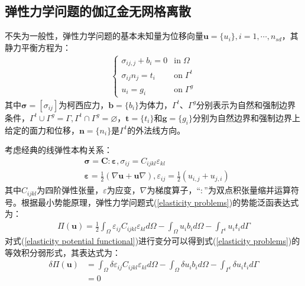 \subsection{弹性力学问题的伽辽金无网格离散}
不失为一般性，弹性力学问题的基本未知量为位移向量$\pmb{u}=\{u_i\},i=1,\dotsb,n_{sd}$，其静力平衡方程为：
\begin{equation}\label{elasticity problems}
\begin{split}
\begin{cases}
    \sigma_{ij,j}+b_i=0&\text{in}\;\Omega\\
    \sigma_{ij}n_j=t_i&\text{on}\;\Gamma^t\\
    u_i=g_i&\text{on}\;\Gamma^g
\end{cases}
\end{split}
\end{equation}
其中$\pmb \sigma=[\sigma_{ij}]$为柯西应力，$\pmb{b}=\{b_i\}$为体力，$\Gamma^t \text{、}\Gamma^g$分别表示为自然和强制边界条件，$\Gamma^t\cup \Gamma^g=\Gamma,\Gamma^t\cap \Gamma^g=\varnothing$，$\pmb{t}=\{t_i\}$和$\pmb{g}=\{g_i\}$分别为自然边界和强制边界上给定的面力和位移，$\pmb{n}=\{n_i\}$是$\Gamma^{t}$的外法线方向。\par
考虑经典的线弹性本构关系：
\begin{equation}\label{constitutive relation}
\begin{split}
        &\pmb{\sigma}=\pmb{C}\pmb{:}\pmb{\varepsilon},\sigma_{ij}=C_{ijkl}\varepsilon_{kl}\\
        &\pmb{\varepsilon}=\frac{1}{2}(\nabla \pmb{u}+\pmb{u}\nabla),\varepsilon_{ij}=\frac{1}{2}(u_{i,j}+u_{j,i})
\end{split}
\end{equation}
其中$C_{ijkl}$为四阶弹性张量，$\varepsilon$为应变，$\nabla$为梯度算子，“$\pmb{:}$”为双点积张量缩并运算符号。根据最小势能原理，弹性力学问题式(\ref{elasticity problems})的势能泛函表达式为：
\begin{equation}\label{elasticity potential functional}
\begin{split}
    \Pi(\pmb{u})=\frac{1}{2}\int_{\Omega}\varepsilon_{ij}C_{ijkl}\varepsilon_{kl}d\Omega-\int_{\Omega}u_ib_id\Omega-\int_{\Gamma^t}u_it_id\Gamma
\end{split}
\end{equation}
对式(\ref{elasticity potential functional})进行变分可以得到式(\ref{elasticity problems})的等效积分弱形式，其表达式为：
\begin{equation}\label{elasticity weak form}
\begin{split}
    \delta\Pi(\pmb{u})&=\int_{\Omega}\delta\varepsilon_{ij}C_{ijkl}\varepsilon_{kl}d\Omega-\int_{\Omega}\delta u_ib_id\Omega-\int_{\Gamma^t}\delta u_it_id\Gamma\\
   &=0
\end{split}
\end{equation}\par
